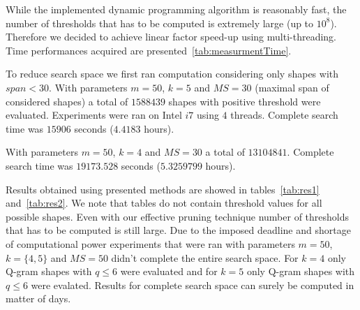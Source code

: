 \documentclass[paper=a4, fontsize=11pt]{scrartcl} %
\numberwithin{equation}{section} %
\numberwithin{figure}{section} %
\numberwithin{table}{section} %
\begin{document}
While the implemented dynamic programming algorithm is reasonably fast,
the number of thresholds that has to be computed is extremely large (up to
$10^8$). Therefore we decided to achieve linear factor speed-up using multi-threading. Time
performances acquired are presented~\ref{tab:measurmentTime}.

To reduce search space we first ran computation considering only shapes with
$span < 30$. With parameters $m=50$, $k=5$ and $MS=30$ (maximal span of
considered shapes) a total of $1588439$ shapes with positive threshold were
evaluated. Experiments were ran on Intel $i7$ using $4$ threads. Complete search
time was $15906$ seconds ($4.4183$ hours).

With parameters $m=50$, $k=4$ and $MS=30$ a total of $13104841$. Complete search
time was $19173.528$ seconds ($5.3259799$ hours). 

Results obtained using presented methods are showed in tables~\ref{tab:res1}
and~\ref{tab:res2}. We note that tables do not contain threshold values for all
possible shapes. Even with our effective pruning technique number of thresholds
that has to be computed is still large. Due to the imposed deadline and
shortage of computational power experiments that were ran with parameters
$m=50$, $k=\{4,5\}$ and $MS = 50$ didn't complete the entire search space. For
$k=4$ only Q-gram shapes with $q \leq 6$ were evaluated and for $k=5$ only
Q-gram shapes with $q \leq 6$ were evalated. Results for complete search space
can surely be computed in matter of days.
\end{document}
